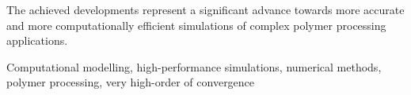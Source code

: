 The achieved developments represent a significant advance towards more accurate and more computationally efficient simulations of complex polymer processing applications.

\vspace{0.5cm}

\begin{abstractkeywords}
Computational modelling, high-performance simulations, numerical methods, polymer processing, very high-order of convergence
\end{abstractkeywords}

